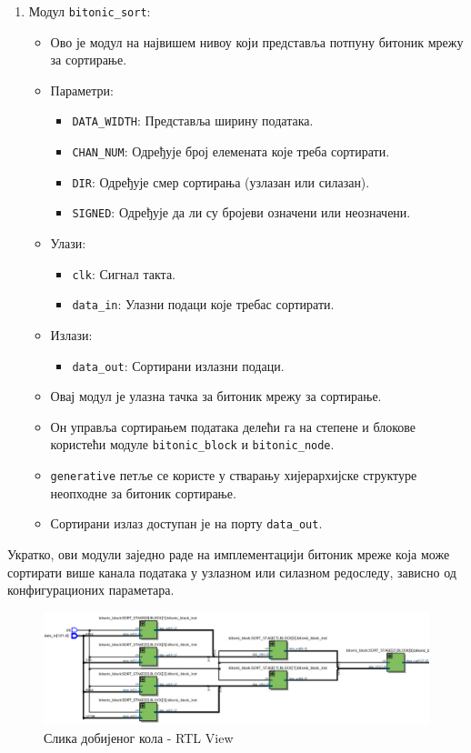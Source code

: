 \documentclass[12pt, a4paper]{article}
\theoremstyle{definition}
\begin{document}
\begin{enumerate}
 \item Модул \verb+bitonic_sort+:
 \begin{itemize}
  \item Ово је модул на највишем нивоу који представља потпуну битоник мрежу за сортирање.
  \item Параметри:
  \begin{itemize}
   \item \verb+DATA_WIDTH+: Представља ширину података.
   \item \verb+CHAN_NUM+: Одређује број елемената које треба сортирати.
   \item \verb+DIR+: Одређује смер сортирања (узлазан или силазан).
   \item \verb+SIGNED+: Одређује да ли су бројеви означени или неозначени.
  \end{itemize}
  \item Улази:
  \begin{itemize}
   \item \verb+clk+: Сигнал такта.
   \item \verb+data_in+: Улазни подаци које требас сортирати.
  \end{itemize}
  \item Излази:
  \begin{itemize}
   \item \verb+data_out+: Сортирани излазни подаци.
  \end{itemize}
  \item Овај модул је улазна тачка за битоник мрежу за сортирање.
  \item Он управља сортирањем података делећи га на степене и блокове користећи модуле \verb+bitonic_block+ и \verb+bitonic_node+.
  \item \verb+generative+ петље се користе у стварању хијерархијске структуре неопходне за битоник сортирање.
  \item Сортирани излаз доступан је на порту \verb+data_out+.
 \end{itemize}
\end{enumerate}

Укратко, ови модули заједно раде на имплементацији битоник мреже која може сортирати више канала података у узлазном или силазном редоследу, зависно од конфигурационих параметара.

\begin{figure}[H]
  \centering
      \includegraphics[scale=0.28]{slike/rtl_verilog2.png}
  \caption{Слика добијеног кола - RTL View}
  \label{fig:rtl_verilog}
\end{figure}
\end{document}
